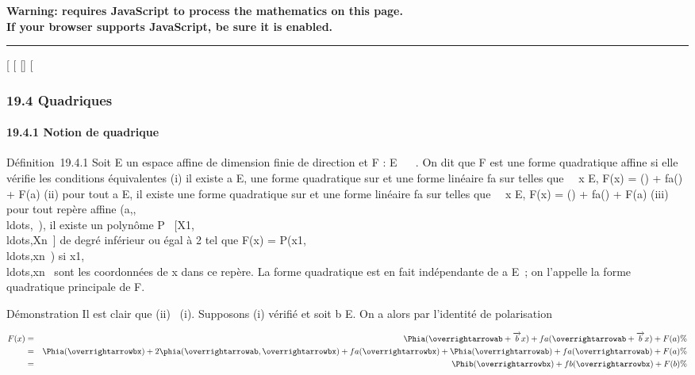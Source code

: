 \textbf{Warning: 
requires JavaScript to process the mathematics on this page.\\ If your
browser supports JavaScript, be sure it is enabled.}

\begin{center}\rule{3in}{0.4pt}\end{center}

{[}
{[}
{[}{]}
{[}

\subsubsection{19.4 Quadriques}

\paragraph{19.4.1 Notion de quadrique}

Définition~19.4.1 Soit E un espace affine de dimension finie de
direction \vecE et F : E \rightarrow~ ~. On dit que F est une
forme quadratique affine si elle vérifie les conditions équivalentes (i)
il existe a \in E, une forme quadratique \Phia sur
\vecE et une forme linéaire fa sur
\vecE telles que \forall~~x \in E,
F(x) = \Phia(\overrightarrowax) +
fa(\overrightarrowax) + F(a) (ii) pour tout
a \in E, il existe une forme quadratique \Phia sur
\vecE et une forme linéaire fa sur
\vecE telles que \forall~~x \in E,
F(x) = \Phia(\overrightarrowax) +
fa(\overrightarrowax) + F(a) (iii) pour
tout repère affine
(a,,\\ldots,\overrightarrowen~),
il existe un polynôme P \in
{}~{[}X1,\\ldots,Xn~{]}
de degré inférieur ou égal à 2 tel que F(x) =
P(x1,\\ldots,xn~)
si
x1,\\ldots,xn~
sont les coordonnées de x dans ce repère. La forme quadratique
\Phia est en fait indépendante de a \in E~; on l'appelle la forme
quadratique principale de F.

Démonstration Il est clair que (ii) \rigtharrow~(i). Supposons (i) vérifié et soit
b \in E. On a alors par l'identité de polarisation

\begin{align*} F(x)& =&
\Phia(\overrightarrowab
+\overrightarrow bx) +
fa(\overrightarrowab
+\overrightarrow bx) + F(a) \%&
\\ & =&
\Phia(\overrightarrowbx) +
2\phia(\overrightarrowab,\overrightarrowbx)
+ fa(\overrightarrowbx) +
\Phia(\overrightarrowab) +
fa(\overrightarrowab) + F(a)\%&
\\ & =&
\Phib(\overrightarrowbx) +
fb(\overrightarrowbx) + F(b) \%&
\\ \end{align*}

